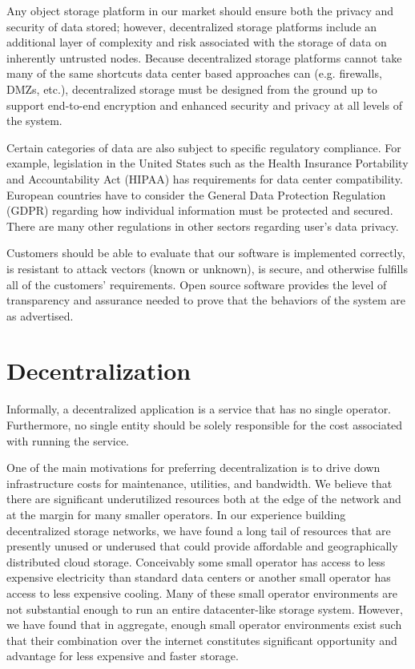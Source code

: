 \documentclass[11pt,fleqn,openany]{book}
\begin{document}
Any object storage platform in our market should ensure both the privacy and
security of data stored; however,
decentralized storage platforms include an additional layer of
complexity and risk associated with the storage of data on inherently
untrusted nodes. Because decentralized storage platforms cannot take many
of the same shortcuts data center based approaches can (e.g. firewalls, DMZs,
etc.), decentralized storage must be designed from the ground up to support
end-to-end encryption and enhanced security and privacy at all levels of the
system.

Certain categories of data are also subject to specific regulatory compliance.
For example, legislation in the United States such as
the Health Insurance Portability and
Accountability Act (HIPAA) has requirements for data center
compatibility. European countries have to consider the General Data Protection
Regulation (GDPR) regarding
how individual information must be protected and secured. There
are many other regulations in other sectors regarding user's data privacy.

Customers should be able to
evaluate that our software is implemented correctly, is resistant to
attack vectors (known or unknown), is secure, and otherwise fulfills all
of the customers' requirements.
Open source software
provides the level of transparency and assurance needed to prove that the
behaviors of the system are as advertised.

\section{Decentralization}

Informally, a decentralized application is a service that has no single
operator. Furthermore, no single entity should be solely responsible for the
cost associated with running the service.

One of the main motivations for preferring decentralization is to drive
down infrastructure costs for maintenance, utilities, and bandwidth.
We believe that there
are significant underutilized resources both at the edge of the network and at
the margin for many smaller operators. In our experience building decentralized
storage networks, we have found a long tail of resources that are presently
unused or underused that could provide affordable and
geographically distributed cloud storage. Conceivably some small operator
has access to less expensive electricity than standard data centers or another small
operator has access to less expensive cooling. Many of these small operator
environments are not substantial enough to run an entire datacenter-like
storage system. However, we have found that in aggregate, enough small operator
environments exist such that their combination over the internet constitutes
significant opportunity and advantage for less expensive and faster storage.
\end{document}
